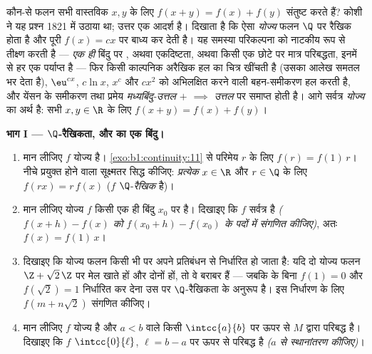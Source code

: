 \begin{problem}[{सप्ताहांत समस्या --- $f(x + y) = f(x) + f(y)$: नियमितता रैखिकता पर बाध्य कर देती है, और राक्षसों
का चित्र}]
\label{pb:b1:continuity:1}
कौन-से फलन सभी वास्तविक $x, y$ के लिए $f(x + y) = f(x) + f(y)$ संतुष्ट करते
हैं? कोशी ने यह प्रश्न 1821 में उठाया था; उत्तर एक आदर्श है।
 दिखाता है कि ऐसा \emph{योज्य} फलन $\Q$ पर रैखिक
होता है और पूरी  $f(x) = cx$ पर बाध्य कर देती है। यह समस्या परिकल्पना
को नाटकीय रूप से तीक्ष्ण करती है --- \emph{एक ही} बिंदु पर , अथवा
एकदिष्टता, अथवा किसी एक छोटे  पर मात्र परिबद्धता, इनमें से हर एक
पर्याप्त है --- फिर किसी काल्पनिक अरैखिक हल का चित्र खींचती है (उसका आलेख
समतल भर देता है), $\eu^{cx}$, $c\ln x$, $x^c$ और $cx^2$ को अभिलक्षित करने
वाली बहन-समीकरण हल करती है, और येंसन के समीकरण तथा प्रमेय
\emph{मध्यबिंदु-उत्तल $+$  $\implies$ उत्तल} पर समाप्त होती
है। आगे सर्वत्र \emph{योज्य}
का अर्थ है: सभी $x, y \in \R$ के लिए $f(x + y) = f(x) + f(y)$।

\medskip \noindent\textbf{भाग I --- $\Q$-रैखिकता, और  का एक बिंदु।}
\begin{enumerate}
  \item मान लीजिए $f$ योज्य है। \cref{exo:b1:continuity:11} से परिमेय $r$ के
  लिए $f(r) = f(1)\,r$। नीचे प्रयुक्त होने वाला सूक्ष्मतर  सिद्ध कीजिए:
  \emph{प्रत्येक} $x \in \R$ और $r \in \Q$ के लिए $f(rx) = r\,f(x)$ ($f$
  $\Q$-\emph{रैखिक} है)।
  \item मान लीजिए योज्य $f$ किसी एक ही बिंदु $x_0$ पर  है। दिखाइए कि $f$
  सर्वत्र  है \emph{($f(x + h) - f(x)$ को $f(x_0 + h) - f(x_0)$ के पदों
  में संगणित कीजिए)}, अतः $f(x) = f(1)\,x$।
  \item दिखाइए कि योज्य फलन किसी भी   पर अपने प्रतिबंधन से
  निर्धारित हो जाता है: यदि दो योज्य फलन $\Z + \sqrt2\,\Z$ पर मेल खाते हों
  और दोनों  हों, तो वे बराबर हैं --- जबकि  के बिना $f(1) = 0$ और
  $f(\sqrt 2) = 1$ निर्धारित कर देना उस  पर $\Q$-रैखिकता के अनुरूप है।
  इस निर्धारण के लिए $f(m + n\sqrt2)$ संगणित कीजिए।
  \item मान लीजिए $f$ योज्य है और $a < b$ वाले किसी  $\intcc{a}{b}$ पर
  ऊपर से $M$ द्वारा परिबद्ध है। दिखाइए कि $f$ $\intcc{0}{\ell}$, $\ell = b -
  a$ पर ऊपर से परिबद्ध है \emph{($a$ से स्थानांतरण कीजिए)}।
\end{enumerate}


\end{problem}
